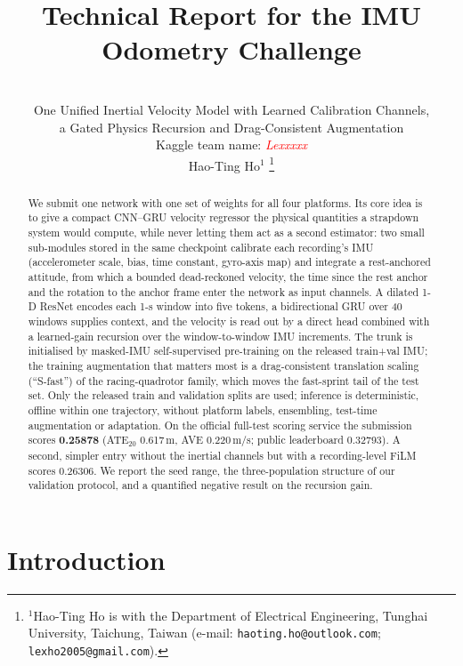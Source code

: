 \documentclass[letterpaper,10pt,conference]{ieeeconf}
\title{\LARGE \bf Technical Report for the IMU Odometry Challenge}
\author{\\
One Unified Inertial Velocity Model with Learned Calibration Channels,\\a Gated Physics Recursion and Drag-Consistent Augmentation\\
Kaggle team name: \textcolor{red}{\textit{Lexxxxx}}\\
Hao-Ting Ho$^{1}$%
\thanks{$^{1}$Hao-Ting Ho is with the Department of Electrical Engineering, Tunghai University,
        Taichung, Taiwan (e-mail: {\tt\small haoting.ho@outlook.com}; {\tt\small lexho2005@gmail.com}).}%
}
\begin{document}
\maketitle
\thispagestyle{empty}
\pagestyle{empty}

\begin{abstract}
We submit one network with one set of weights for all four platforms. Its core idea is to give a
compact CNN--GRU velocity regressor the physical quantities a strapdown system would compute, while
never letting them act as a second estimator: two small sub-modules stored in the same checkpoint
calibrate each recording's IMU (accelerometer scale, bias, time constant, gyro-axis map) and
integrate a rest-anchored attitude, from which a bounded dead-reckoned velocity, the time since the
rest anchor and the rotation to the anchor frame enter the network as input channels. A dilated
1-D ResNet encodes each 1-s window into five tokens, a bidirectional GRU over 40 windows supplies
context, and the velocity is read out by a direct head combined with a learned-gain recursion over
the window-to-window IMU increments. The trunk is initialised by masked-IMU self-supervised
pre-training on the released train+val IMU; the training augmentation that matters most is a
drag-consistent translation scaling (``S-fast'') of the racing-quadrotor family, which moves the
fast-sprint tail of the test set. Only the released train and validation splits are used; inference
is deterministic, offline within one trajectory, without platform labels, ensembling, test-time
augmentation or adaptation. On the official full-test scoring service the submission scores
\textbf{0.25878} (ATE$_{20}$ 0.617\,m, AVE 0.220\,m/s; public leaderboard 0.32793). A second,
simpler entry without the inertial channels but with a recording-level FiLM scores 0.26306. We
report the seed range, the three-population structure of our validation protocol, and a quantified
negative result on the recursion gain.
\end{abstract}

\section{Introduction}
\end{document}
